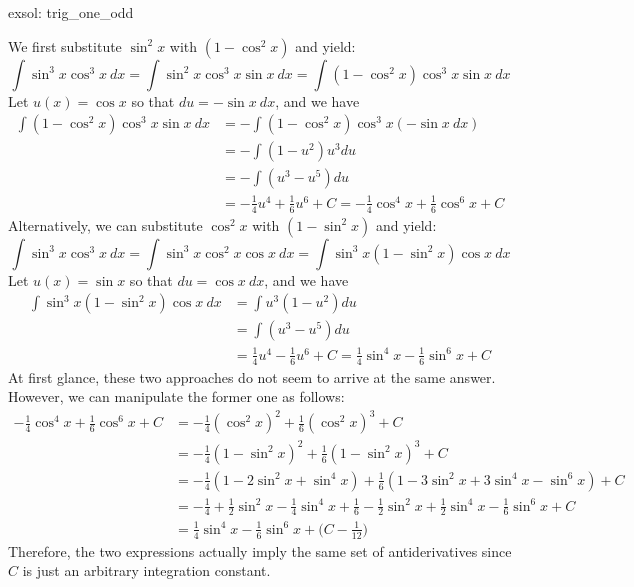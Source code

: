\begin{exsol}[]{exsol: trig_one_odd}
\begin{enumerate}[a)]
        We first substitute $\sin^2x$ with $(1-\cos^2x)$ and yield:
        \[\int \sin^3 x \cos^3 x~dx = \int \sin^2x \cos^3x \sin x~dx = \int (1-\cos^2x)\cos^3x \sin x~dx\]
        Let $u(x) = \cos x$ so that $du = -\sin x~dx$, and we have
        \begin{align*}
            \int (1-\cos^2x) \cos^3x \sin x~dx &= -\int (1-\cos^2x) \cos^3x (-\sin x~dx)\\
            &= -\int (1 - u^2) u^3 du\\
            &= -\int (u^3 - u^5) du\\
            &= -\frac{1}{4}u^4 + \frac{1}{6}u^6 + C = -\frac{1}{4}\cos^4x + \frac{1}{6}\cos^6x + C
        \end{align*}
        Alternatively, we can substitute $\cos^2x$ with $(1-\sin^2x)$ and yield:
        \[\int \sin^3 x \cos^3 x~dx = \int \sin^3x \cos^2x \cos x~dx = \int \sin^3x (1-\sin^2x) \cos x~dx\]
        Let $u(x) = \sin x$ so that $du = \cos x~dx$, and we have
        \begin{align*}
            \int \sin^3x (1-\sin^2x) \cos x~dx &= \int u^3 (1-u^2)du\\
            &= \int (u^3 - u^5) du\\
            &= \frac{1}{4}u^4 - \frac{1}{6}u^6 + C = \frac{1}{4}\sin^4x - \frac{1}{6}\sin^6x + C
        \end{align*}
        At first glance, these two approaches do not seem to arrive at the same answer.  However, we can manipulate the former one as follows:
        \begin{align*}
            -\frac{1}{4}\cos^4x + \frac{1}{6}\cos^6x + C &= -\frac{1}{4}(\cos^2x)^2 + \frac{1}{6}(\cos^2x)^3 + C \\
            &= -\frac{1}{4}(1-\sin^2x)^2 + \frac{1}{6}(1-\sin^2x)^3 + C\\
            &= -\frac{1}{4}(1-2\sin^2x + \sin^4x) + \frac{1}{6}(1-3\sin^2x+3\sin^4x-\sin^6x) + C\\
            &= -\frac{1}{4} + \frac{1}{2} \sin^2x - \frac{1}{4} \sin^4x + \frac{1}{6} -\frac{1}{2}\sin^2x +\frac{1}{2}\sin^4x - \frac{1}{6}\sin^6x + C \\
            &= \frac{1}{4}\sin^4x - \frac{1}{6}\sin^6x + \Big(C - \frac{1}{12}\Big)
        \end{align*}
        Therefore, the two expressions actually imply the same set of antiderivatives since $C$ is just an arbitrary integration constant.
    \end{enumerate}
\end{exsol}
